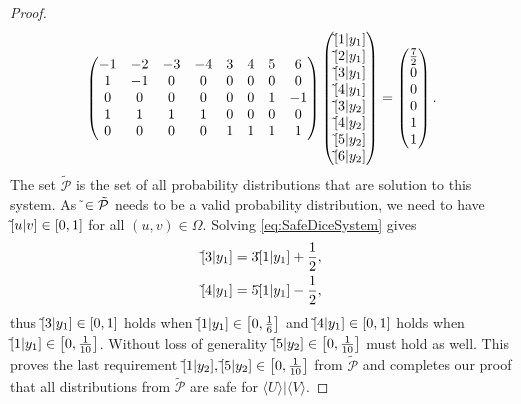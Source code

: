 \documentclass[twoside,a4paper]{report}
\theoremstyle{plain}
\theoremstyle{definition}
\theoremstyle{remark}
\numberwithin{equation}{chapter}
\let\P\relax
\DeclareMathOperator{\P}{\mathbb{P}}
\DeclareMathOperator{\1}{\mathbbm{1}}
\newcommand{\Psafe}{\tilde{\P}}
\begin{document}
\begin{proof}
\begin{equation}
\begin{pmatrix}
-1&-2&-3&-4&3&4&5&6\\
1&-1&0&0&0&0&0&0\\
0&0&0&0&0&0&1&-1\\
1&1&1&1&0&0&0&0\\
0&0&0&0&1&1&1&1
\end{pmatrix}\begin{pmatrix}
\Psafe[1|y_1]\\\Psafe[2|y_1]\\\Psafe[3|y_1]\\\Psafe[4|y_1]\\
\Psafe[3|y_2]\\\Psafe[4|y_2]\\\Psafe[5|y_2]\\\Psafe[6|y_2]
\end{pmatrix}=\begin{pmatrix}
\frac{7}{2}\\0\\0\\0\\1\\1
\end{pmatrix}.
\end{equation}
The set $\tilde{\mathcal{P}}$ is the set of all probability distributions that are solution to this system. As $\Psafe\in\tilde{\mathcal{P}}$ needs to be a valid probability distribution, we need to have $\Psafe[u|v]\in[0,1]$ for all $(u,v)\in\Omega$. Solving \eqref{eq:SafeDiceSystem} gives
\begin{align}
\Psafe[3|y_1]&=3\Psafe[1|y_1]+\frac{1}{2},\\
\Psafe[4|y_1]&=5\Psafe[1|y_1]-\frac{1}{2},
\end{align}
thus $\Psafe[3|y_1]\in[0,1]$ holds when $\Psafe[1|y_1]\in\left[0,\frac{1}{6}\right]$ and $\Psafe[4|y_1]\in[0,1]$ holds when $\Psafe[1|y_1]\in\left[0,\frac{1}{10}\right]$. Without loss of generality $\Psafe[5|y_2]\in\left[0,\frac{1}{10}\right]$ must hold as well. This proves the last requirement $\Psafe[1|y_2],\Psafe[5|y_2]\in\left[0,\frac{1}{10}\right]$ from $\tilde{\mathcal{P}}$ and completes our proof that all distributions from $\tilde{\mathcal{P}}$ are safe for $\langle U\rangle|\langle V\rangle$.


\end{proof}
\end{document}
